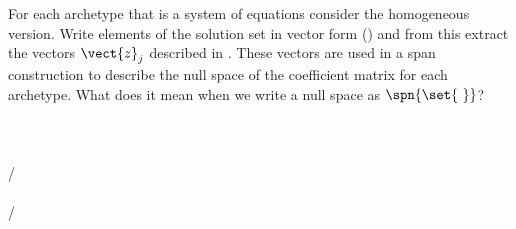For each archetype that is a system of equations consider the homogeneous version. Write elements of the solution set in vector form () and from this extract the vectors $\vect{z}_j$ described in .  These vectors are used in a span construction to describe the null space of the coefficient matrix for each archetype.  What does it mean when we write a null space as $\spn{\set{\ }}$?\\
\\ 
\\ 
\\ 
/\\ 
\\ 
/\\ 
\\

